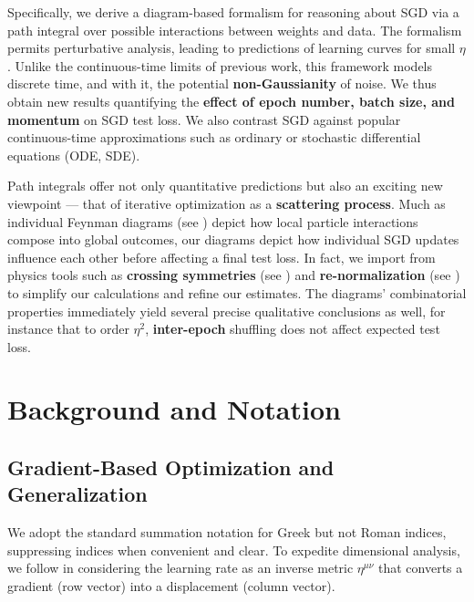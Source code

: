 \documentclass{article}
\begin{document}
    Specifically, we derive a diagram-based formalism for reasoning about SGD
    via a path integral over possible interactions between weights and data.
    The formalism permits perturbative analysis, leading to predictions of
    learning curves for small $\eta$.  Unlike the continuous-time limits of
    previous work, this framework models discrete time, and with it, the
    potential {\bf non-Gaussianity} of noise.  We thus obtain new results
    quantifying the {\bf effect of epoch number, batch size, and momentum} on
    SGD test loss.  We also contrast SGD against popular continuous-time
    approximations such as ordinary or stochastic differential equations (ODE,
    SDE).
    
    Path integrals offer not only quantitative predictions but also an exciting
    new viewpoint --- that of iterative optimization as a {\bf scattering
    process}.  Much as individual Feynman diagrams (see \citet{dy49a}) depict
    how local particle interactions compose into global outcomes, our diagrams
    depict how individual SGD updates influence each other before affecting a
    final test loss.  In fact, we import from physics tools such as {\bf
    crossing symmetries} (see \citet{dy49b}) and {\bf re-normalization} (see
    \citet{ge54}) to simplify our calculations and refine our estimates.
    The diagrams' combinatorial properties immediately yield several precise
    qualitative conclusions as well, for instance that to order $\eta^2$, {\bf
    inter-epoch} shuffling does not affect expected test loss.


\section{Background and Notation}

\subsection*{Gradient-Based Optimization and Generalization}
    We adopt the standard summation notation for Greek but not Roman indices,
    suppressing indices when convenient and clear.  To expedite dimensional
    analysis, we follow \cite{bo13} in considering the learning rate as an
    inverse metric $\eta^{\mu\nu}$ that converts a gradient (row vector) into a
    displacement (column vector).
\end{document}

